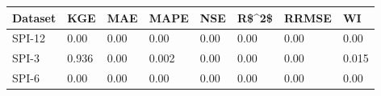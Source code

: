 \begin{tabular}{llllllll}
\toprule
Dataset &    KGE &   MAE &   MAPE &   NSE & R\$\textasciicircum 2\$ & RRMSE &     WI \\
\midrule
 SPI-12 &   0.00 &  0.00 &   0.00 &  0.00 &  0.00 &  0.00 &   0.00 \\
  SPI-3 &  0.936 &  0.00 &  0.002 &  0.00 &  0.00 &  0.00 &  0.015 \\
  SPI-6 &   0.00 &  0.00 &   0.00 &  0.00 &  0.00 &  0.00 &   0.00 \\
\bottomrule
\end{tabular}
